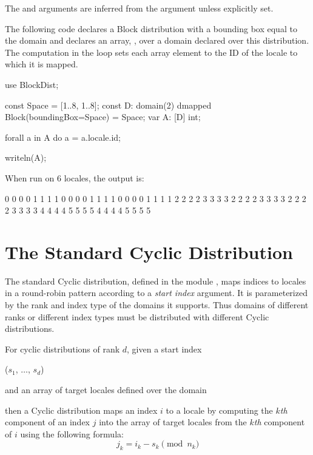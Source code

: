 The  and  arguments are inferred from the
 argument unless explicitly set.

\begin{example}
The following code declares a Block distribution with a bounding box
equal to the domain  and declares an array, , over
a domain declared over this distribution.  The computation in
the  loop sets each array element to the ID of the locale
to which it is mapped.
\begin{chapel}
use BlockDist;

const Space = [1..8, 1..8];
const D: domain(2) dmapped Block(boundingBox=Space) = Space;
var A: [D] int;

forall a in A do
  a = a.locale.id;

writeln(A);
\end{chapel}
When run on 6 locales, the output is:
\begin{chapel}
0 0 0 0 1 1 1 1
0 0 0 0 1 1 1 1
0 0 0 0 1 1 1 1
2 2 2 2 3 3 3 3
2 2 2 2 3 3 3 3
2 2 2 2 3 3 3 3
4 4 4 4 5 5 5 5
4 4 4 4 5 5 5 5
\end{chapel}
\end{example}

\section{The Standard Cyclic Distribution}
\label{Cyclic_Dist}
The standard Cyclic distribution, defined in the
module , maps indices to locales in a round-robin
pattern according to a \emph{start index} argument.  It is
parameterized by the rank and index type of the domains it supports.
Thus domains of different ranks or different index types must be
distributed with different Cyclic distributions.

For cyclic distributions of rank $d$, given a start index
\begin{chapel}
($s_1$, $\ldots$, $s_d$)
\end{chapel}
and an array of target locales defined over the domain
\begin{chapel}
[$0$..$n_1$-1, $\ldots$, $0$..$n_d$-1]
\end{chapel}
then a Cyclic distribution maps an index $i$ to a locale by computing
the $k$\emph{th} component of an index $j$ into the array of target
locales from the $k$\emph{th} component of $i$ using the following
formula:
\[j_k = i_k - s_k \pmod{n_k}\]

